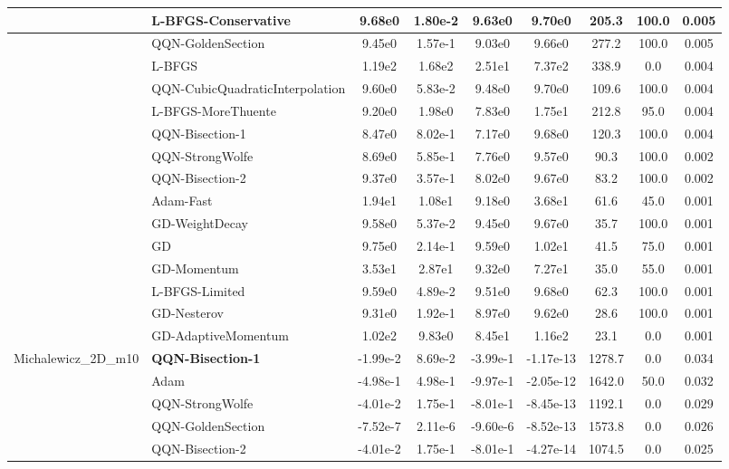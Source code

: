 \documentclass[10pt]{article}
\begin{document}
\begin{longtable}{|l|l|c|c|c|c|c|c|c|}
\hline
 & L-BFGS-Conservative & 9.68e0 & 1.80e-2 & 9.63e0 & 9.70e0 & 205.3 & 100.0 & 0.005 \\
\hline
 & QQN-GoldenSection & 9.45e0 & 1.57e-1 & 9.03e0 & 9.66e0 & 277.2 & 100.0 & 0.005 \\
\hline
 & L-BFGS & 1.19e2 & 1.68e2 & 2.51e1 & 7.37e2 & 338.9 & 0.0 & 0.004 \\
\hline
 & QQN-CubicQuadraticInterpolation & 9.60e0 & 5.83e-2 & 9.48e0 & 9.70e0 & 109.6 & 100.0 & 0.004 \\
\hline
 & L-BFGS-MoreThuente & 9.20e0 & 1.98e0 & 7.83e0 & 1.75e1 & 212.8 & 95.0 & 0.004 \\
\hline
 & QQN-Bisection-1 & 8.47e0 & 8.02e-1 & 7.17e0 & 9.68e0 & 120.3 & 100.0 & 0.004 \\
\hline
 & QQN-StrongWolfe & 8.69e0 & 5.85e-1 & 7.76e0 & 9.57e0 & 90.3 & 100.0 & 0.002 \\
\hline
 & QQN-Bisection-2 & 9.37e0 & 3.57e-1 & 8.02e0 & 9.67e0 & 83.2 & 100.0 & 0.002 \\
\hline
 & Adam-Fast & 1.94e1 & 1.08e1 & 9.18e0 & 3.68e1 & 61.6 & 45.0 & 0.001 \\
\hline
 & GD-WeightDecay & 9.58e0 & 5.37e-2 & 9.45e0 & 9.67e0 & 35.7 & 100.0 & 0.001 \\
\hline
 & GD & 9.75e0 & 2.14e-1 & 9.59e0 & 1.02e1 & 41.5 & 75.0 & 0.001 \\
\hline
 & GD-Momentum & 3.53e1 & 2.87e1 & 9.32e0 & 7.27e1 & 35.0 & 55.0 & 0.001 \\
\hline
 & L-BFGS-Limited & 9.59e0 & 4.89e-2 & 9.51e0 & 9.68e0 & 62.3 & 100.0 & 0.001 \\
\hline
 & GD-Nesterov & 9.31e0 & 1.92e-1 & 8.97e0 & 9.62e0 & 28.6 & 100.0 & 0.001 \\
\hline
 & GD-AdaptiveMomentum & 1.02e2 & 9.83e0 & 8.45e1 & 1.16e2 & 23.1 & 0.0 & 0.001 \\
Michalewicz\_2D\_m10 & \textbf{QQN-Bisection-1} & -1.99e-2 & 8.69e-2 & -3.99e-1 & -1.17e-13 & 1278.7 & 0.0 & 0.034 \\
\hline
 & Adam & -4.98e-1 & 4.98e-1 & -9.97e-1 & -2.05e-12 & 1642.0 & 50.0 & 0.032 \\
\hline
 & QQN-StrongWolfe & -4.01e-2 & 1.75e-1 & -8.01e-1 & -8.45e-13 & 1192.1 & 0.0 & 0.029 \\
\hline
 & QQN-GoldenSection & -7.52e-7 & 2.11e-6 & -9.60e-6 & -8.52e-13 & 1573.8 & 0.0 & 0.026 \\
\hline
 & QQN-Bisection-2 & -4.01e-2 & 1.75e-1 & -8.01e-1 & -4.27e-14 & 1074.5 & 0.0 & 0.025 \\

\end{longtable}
\end{document}

